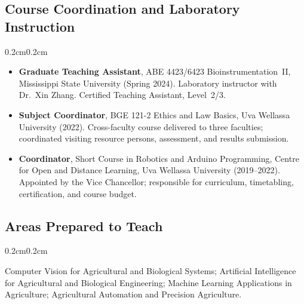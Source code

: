 \documentclass[10pt, letterpaper]{article}
\newenvironment{highlights}{%
    \begin{itemize}[topsep=0.08cm, parsep=0.08cm, partopsep=0pt,
                    itemsep=0pt, leftmargin=0.4cm + 10pt]
}{\end{itemize}}
\newenvironment{onecolentry}{%
    \begin{adjustwidth}{0.2cm}{0.2cm}
}{\end{adjustwidth}}
\begin{document}
\subsection{Course Coordination and Laboratory Instruction}
\begin{onecolentry}
    \begin{highlights}
        \item \textbf{Graduate Teaching Assistant}, ABE 4423/6423 Bioinstrumentation~II,
              Mississippi State University (Spring 2024). Laboratory instructor with
              Dr.\ Xin Zhang. Certified Teaching Assistant, Level~2/3.
        \item \textbf{Subject Coordinator}, BGE 121-2 Ethics and Law Basics,
              Uva Wellassa University (2022). Cross-faculty course delivered to three
              faculties; coordinated visiting resource persons, assessment, and
              results submission.
        \item \textbf{Coordinator}, Short Course in Robotics and Arduino Programming,
              Centre for Open and Distance Learning, Uva Wellassa University
              (2019--2022). Appointed by the Vice Chancellor; responsible for
              curriculum, timetabling, certification, and course budget.
    \end{highlights}
\end{onecolentry}
\vspace{0.14cm}

\subsection{Areas Prepared to Teach}
\begin{onecolentry}
    Computer Vision for Agricultural and Biological Systems; Artificial Intelligence
    for Agricultural and Biological Engineering; Machine Learning Applications in
    Agriculture; Agricultural Automation and Precision Agriculture.
\end{onecolentry}
\vspace{0.10cm}

\end{document}
